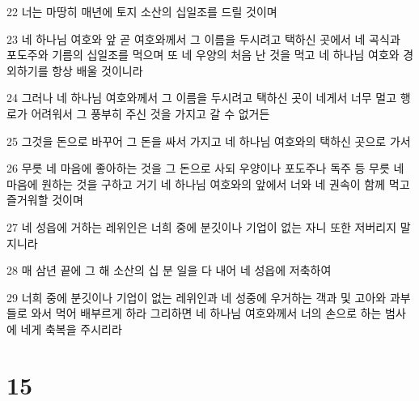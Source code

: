 \par 22 너는 마땅히 매년에 토지 소산의 십일조를 드릴 것이며
\par 23 네 하나님 여호와 앞 곧 여호와께서 그 이름을 두시려고 택하신 곳에서 네 곡식과 포도주와 기름의 십일조를 먹으며 또 네 우양의 처음 난 것을 먹고 네 하나님 여호와 경외하기를 항상 배울 것이니라
\par 24 그러나 네 하나님 여호와께서 그 이름을 두시려고 택하신 곳이 네게서 너무 멀고 행로가 어려워서 그 풍부히 주신 것을 가지고 갈 수 없거든
\par 25 그것을 돈으로 바꾸어 그 돈을 싸서 가지고 네 하나님 여호와의 택하신 곳으로 가서
\par 26 무릇 네 마음에 좋아하는 것을 그 돈으로 사되 우양이나 포도주나 독주 등 무릇 네 마음에 원하는 것을 구하고 거기 네 하나님 여호와의 앞에서 너와 네 권속이 함께 먹고 즐거워할 것이며
\par 27 네 성읍에 거하는 레위인은 너희 중에 분깃이나 기업이 없는 자니 또한 저버리지 말지니라
\par 28 매 삼년 끝에 그 해 소산의 십 분 일을 다 내어 네 성읍에 저축하여
\par 29 너희 중에 분깃이나 기업이 없는 레위인과 네 성중에 우거하는 객과 및 고아와 과부들로 와서 먹어 배부르게 하라 그리하면 네 하나님 여호와께서 너의 손으로 하는 범사에 네게 축복을 주시리라

\chapter{15}


